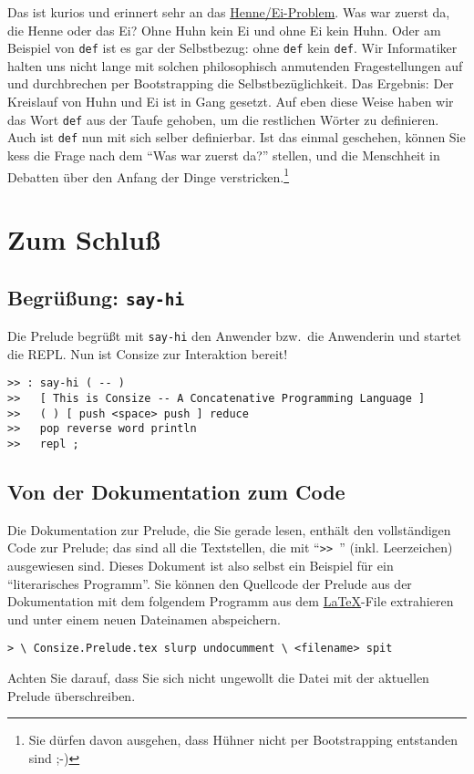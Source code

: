 Das ist kurios und erinnert sehr an das \href{http://de.wikipedia.org/wiki/Henne-Ei-Problem}{Henne/Ei-Problem}. Was war zuerst da, die Henne oder das Ei? Ohne Huhn kein Ei und ohne Ei kein Huhn. Oder am Beispiel von \verb|def| ist es gar der Selbstbezug: ohne \verb|def| kein \verb|def|. Wir Informatiker halten uns nicht lange mit solchen philosophisch anmutenden Fragestellungen auf und durchbrechen per Bootstrapping die Selbstbezüglichkeit. Das Ergebnis: Der Kreislauf von Huhn und Ei ist in Gang gesetzt. Auf eben diese Weise haben wir das Wort \verb|def| aus der Taufe gehoben, um die restlichen Wörter zu definieren. Auch ist \verb|def| nun mit sich selber definierbar.
Ist das einmal geschehen, können Sie kess die Frage nach dem "`Was war zuerst da?"' stellen, und die Menschheit in Debatten über den Anfang der Dinge verstricken.\footnote{Sie dürfen davon ausgehen, dass Hühner nicht per Bootstrapping entstanden sind ;-)}

\section{Zum Schluß}

\subsection{Begrüßung: \texttt{say-hi}}

Die Prelude begrüßt mit \verb|say-hi| den Anwender bzw.\ die Anwenderin und startet die REPL. Nun ist Consize zur Interaktion bereit!

\begin{verbatim}
>> : say-hi ( -- )
>>   [ This is Consize -- A Concatenative Programming Language ]
>>   ( ) [ push <space> push ] reduce
>>   pop reverse word println
>>   repl ;
\end{verbatim}

\subsection{Von der Dokumentation zum Code}

Die Dokumentation zur Prelude, die Sie gerade lesen, enthält den voll\-stän\-di\-gen Code zur Prelude; das sind all die Textstellen, die mit "`\verb|>> |"' (inkl. Leerzeichen) ausgewiesen sind. Dieses Dokument ist also selbst ein Beispiel für ein "`literarisches Programm"'. Sie können den Quellcode der Prelude aus der Dokumentation mit dem folgendem Programm aus dem \href{http://de.wikipedia.org/wiki/LaTeX}{\LaTeX}-File extrahieren und unter einem neuen Dateinamen abspeichern.

\begin{verbatim}
> \ Consize.Prelude.tex slurp undocumment \ <filename> spit
\end{verbatim}

Achten Sie darauf, dass Sie sich nicht ungewollt die Datei mit der aktuellen Prelude überschreiben.


